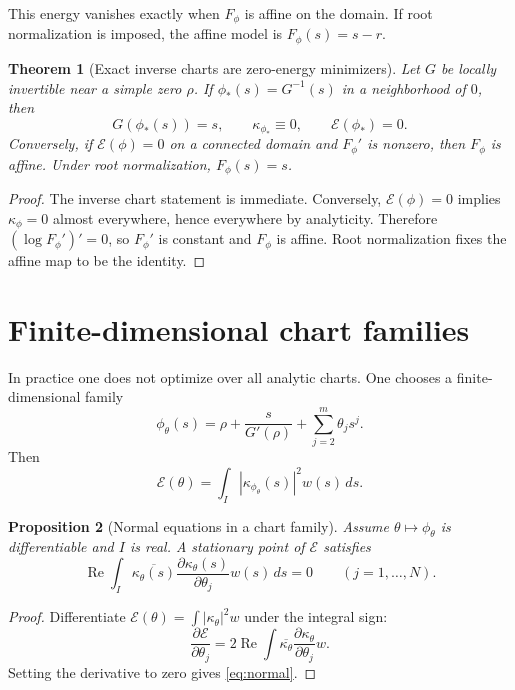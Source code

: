 \documentclass[11pt]{article}
\newtheorem{theorem}{Theorem}[section]
\newtheorem{proposition}[theorem]{Proposition}
\theoremstyle{definition}
\newcommand{\E}{\mathcal E}
\begin{document}
This energy vanishes exactly when $F_\phi$ is affine on the domain. If root normalization is imposed, the affine model is $F_\phi(s)=s-r$.

\begin{theorem}[Exact inverse charts are zero-energy minimizers]\label{thm:zero}
Let $G$ be locally invertible near a simple zero $\rho$. If $\phi_*(s)=G^{-1}(s)$ in a neighborhood of $0$, then
\[
G(\phi_*(s))=s,
\qquad
\kappa_{\phi_*}\equiv0,
\qquad
\E(\phi_*)=0.
\]
Conversely, if $\E(\phi)=0$ on a connected domain and $F_\phi'$ is nonzero, then $F_\phi$ is affine. Under root normalization, $F_\phi(s)=s$.
\end{theorem}

\begin{proof}
The inverse chart statement is immediate. Conversely, $\E(\phi)=0$ implies $\kappa_\phi=0$ almost everywhere, hence everywhere by analyticity. Therefore $(\log F_\phi')'=0$, so $F_\phi'$ is constant and $F_\phi$ is affine. Root normalization fixes the affine map to be the identity.
\end{proof}

\section{Finite-dimensional chart families}

In practice one does not optimize over all analytic charts. One chooses a finite-dimensional family
\[
\phi_\theta(s)=\rho+\frac{s}{G'(\rho)}+\sum_{j=2}^m \theta_j s^j.
\]
Then
\[
\E(\theta)=\int_I |\kappa_{\phi_\theta}(s)|^2w(s)\,ds.
\]

\begin{proposition}[Normal equations in a chart family]\label{prop:normal}
Assume $\theta\mapsto\phi_\theta$ is differentiable and $I$ is real. A stationary point of $\E$ satisfies
\begin{equation}\label{eq:normal}
\operatorname{Re}\int_I \overline{\kappa_\theta(s)}
\frac{\partial \kappa_\theta(s)}{\partial \theta_j}
w(s)\,ds=0
\qquad(j=1,\dots,N).
\end{equation}
\end{proposition}

\begin{proof}
Differentiate $\E(\theta)=\int |\kappa_\theta|^2w$ under the integral sign:
\[
\frac{\partial\E}{\partial\theta_j}
=
2\operatorname{Re}\int \overline{\kappa_\theta}
\frac{\partial\kappa_\theta}{\partial\theta_j}w.
\]
Setting the derivative to zero gives \eqref{eq:normal}.
\end{proof}
\end{document}
